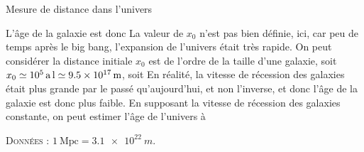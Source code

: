 \begin{exo}[PC][1][TD]{Mesure de distance dans l'univers}
\begin{quest}
{$$      $$
      L'âge de la galaxie est donc
      La valeur de $x_0$ n'est pas bien définie, ici, car peu de temps après le big bang, l'expansion de l'univers était très rapide. On peut considérer la distance initiale $x_0$ est de l'ordre de la taille d'une galaxie, soit $x_0 \simeq \SI{e5}{a.l} \simeq  \SI{9.5E17}{m}$, soit 
      En réalité, la vitesse de récession des galaxies était plus grande par le passé qu'aujourd'hui, et non l'inverse, et donc l'âge de la galaxie est donc plus faible. En supposant la vitesse de récession des galaxies constante, on peut estimer l'âge de l'univers à 
     }
      
  \end{quest}
  \textsc{Données} : 
   $1 \mathrm{~Mpc} = \SI{3,1e22}{m}$.
\end{exo}

